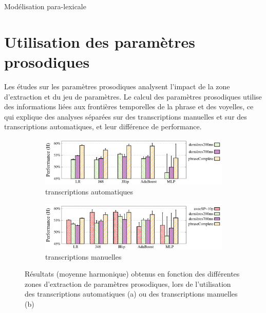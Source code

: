 \documentclass{style/these}
\begin{document}
\begin{part}{Modélisation para-lexicale}
\minitoc

\newpage

\section{Utilisation des paramètres prosodiques}
\label{sec:prosod}
\renewcommand{\rightmark}{Utilisation des paramètres prosodiques}

Les études sur les paramètres prosodiques analysent l'impact de la zone d'extraction et du jeu de paramètres. 
Le calcul des paramètres prosodiques utilise des informations liées aux frontières temporelles de la phrase et des voyelles, ce qui explique des analyses séparées sur des transcriptions manuelles et sur des transcriptions automatiques, et leur différence de performance. 

\begin{figure}[h!]
\begin{subfigure}{\textwidth}
\centering
\includegraphics[scale=0.56]{images/results/prosodicZones_onDecodings.pdf} 
\caption{transcriptions automatiques}
\end{subfigure}
\begin{subfigure}{\textwidth}
\centering
\includegraphics[scale=0.56]{images/results/prosodicZones_onTranscripts.pdf}
\caption{transcriptions manuelles}
\end{subfigure}
\caption{Résultats (moyenne harmonique) obtenus en fonction des différentes zones d'extraction de paramètres prosodiques, lors de l'utilisation des transcriptions automatiques (a) ou des transcriptions manuelles (b)}
\label{Fig:QD-p-pZones}
\end{figure}



\end{part}
\end{document}
